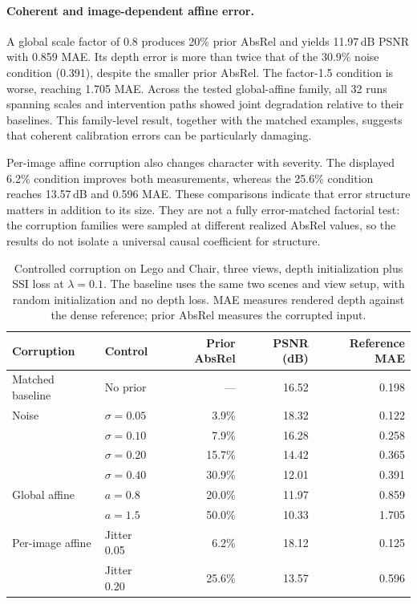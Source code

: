 \documentclass[10pt,a4paper]{article}
\begin{document}
\paragraph{Coherent and image-dependent affine error.} A global scale factor of 0.8
produces 20\% prior AbsRel and yields 11.97\,dB PSNR with 0.859 MAE. Its depth error
is more than twice that of the 30.9\% noise condition (0.391), despite the smaller
prior AbsRel. The factor-1.5 condition is worse, reaching 1.705 MAE. Across the tested
global-affine family, all 32 runs spanning scales and intervention paths showed joint
degradation relative to their baselines. This family-level result, together with the
matched examples, suggests that coherent calibration errors can be particularly
damaging.

Per-image affine corruption also changes character with severity. The displayed
6.2\% condition improves both measurements, whereas the 25.6\% condition reaches
13.57\,dB and 0.596 MAE. These comparisons indicate that error structure matters in
addition to its size. They are not a fully error-matched factorial test: the
corruption families were sampled at different realized AbsRel values, so the results
do not isolate a universal causal coefficient for structure.

\begin{table}[!htbp]\centering\small
\caption{Controlled corruption on Lego and Chair, three views, depth initialization
plus SSI loss at $\lambda=0.1$. The baseline uses the same two scenes and view setup,
with random initialization and no depth loss. MAE measures rendered depth against the
dense reference; prior AbsRel measures the corrupted input.}
\label{tab:corruption}
\begin{tabular}{llrrr}
\toprule
Corruption & Control & Prior AbsRel & PSNR (dB) & Reference MAE\\
\midrule
Matched baseline & No prior & --- & 16.52 & 0.198\\
\midrule
Noise & $\sigma=0.05$ & 3.9\% & 18.32 & 0.122\\
 & $\sigma=0.10$ & 7.9\% & 16.28 & 0.258\\
 & $\sigma=0.20$ & 15.7\% & 14.42 & 0.365\\
 & $\sigma=0.40$ & 30.9\% & 12.01 & 0.391\\
Global affine & $a=0.8$ & 20.0\% & 11.97 & 0.859\\
 & $a=1.5$ & 50.0\% & 10.33 & 1.705\\
Per-image affine & Jitter 0.05 & 6.2\% & 18.12 & 0.125\\
 & Jitter 0.20 & 25.6\% & 13.57 & 0.596\\
\bottomrule
\end{tabular}
\end{table}
\end{document}
